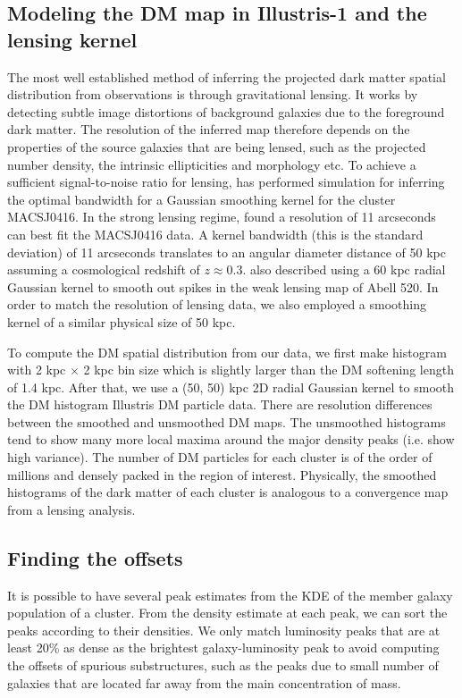 \subsection{Modeling the DM map in Illustris-1 and the lensing kernel}
The most well established method of inferring the projected dark matter spatial 
distribution from observations is through gravitational lensing.
It works by detecting subtle image distortions of background galaxies due to
the foreground dark matter. The resolution of the inferred map therefore 
depends on the properties of the source galaxies that are being lensed, 
such as the projected number density, the intrinsic ellipticities and morphology etc.
To achieve a sufficient signal-to-noise ratio for lensing, 
\cite{Hoag2016} has performed simulation for inferring the optimal bandwidth
for a Gaussian smoothing kernel for the cluster MACSJ0416. 
In the strong lensing regime, \cite{Hoag2016} found a resolution of 11 arcseconds
can best fit the MACSJ0416 data. A kernel bandwidth (this is the standard deviation) 
of 11 arcseconds translates to an angular diameter distance of 50 
kpc assuming a cosmological redshift of $z \approx 0.3$. 
\cite{Clowe2012} also described using a 60 kpc radial Gaussian kernel to smooth out spikes
in the weak lensing map of Abell 520. In order to match the resolution of lensing data,
we also employed a smoothing kernel of a similar physical size of 50 kpc.  

To compute the DM spatial distribution from our data, we first make histogram with 2 kpc
$\times$ 2 kpc bin size which is slightly larger than the DM softening length of 1.4 kpc. 
After that, we use a (50, 50) kpc 2D radial Gaussian kernel 
to smooth the DM histogram Illustris DM
particle data. 
There are resolution differences between the smoothed and unsmoothed DM
maps. The unsmoothed histograms tend to show many more local maxima around the major
density peaks (i.e. show high variance). 
The number of DM particles for each cluster is of 
the order of millions and densely packed in the region of
interest. 
Physically, the smoothed histograms of the dark matter of each cluster 
is analogous to a convergence map from a lensing analysis. 


\subsection{Finding the offsets} \label{subsec:offsets}
It is possible to have several peak estimates from the KDE of the member galaxy 
population of a cluster. 
From the density estimate at each peak, we can sort 
the peaks according to their densities. We only match luminosity 
peaks that are at 
least 20\% as dense as the brightest galaxy-luminosity peak to avoid 
computing the offsets of spurious substructures, such as the peaks due to 
small number of galaxies that are located far away from the main concentration of mass.

